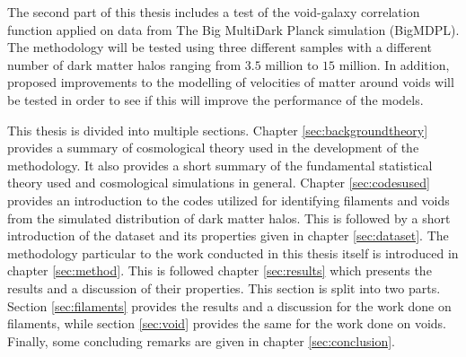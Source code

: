 The second part of this thesis includes a test of the void-galaxy correlation function applied on data from The Big MultiDark Planck simulation (BigMDPL)\cite{Multidark_dataset}. The methodology will be tested using three different samples with a different number of dark matter halos ranging from $3.5$ million to $15$ million. In addition, proposed improvements to the modelling of velocities of matter around voids\cite{Achitouv_streaming} will be tested in order to see if this will improve the performance of the models.\\\indent

This thesis is divided into multiple sections. Chapter \ref{sec:backgroundtheory} provides a summary of cosmological theory used in the development of the methodology. It also provides a short summary of the fundamental statistical theory used and cosmological simulations in general. Chapter \ref{sec:codesused} provides an introduction to the codes utilized for identifying filaments and voids from the simulated distribution of dark matter halos. This is followed by a short introduction of the dataset and its properties given in chapter \ref{sec:dataset}. The methodology particular to the work conducted in this thesis itself is introduced in chapter \ref{sec:method}. This is followed chapter \ref{sec:results} which presents the results and a discussion of their properties. This section is split into two parts. Section \ref{sec:filaments} provides the results and a discussion for the work done on filaments, while section \ref{sec:void} provides the same for the work done on voids. Finally, some concluding remarks are given in chapter \ref{sec:conclusion}. 
